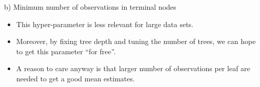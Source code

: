 \documentclass[
  10pt,
  ignorenonframetext,
]{beamer}
\providecommand{\tightlist}{%
  \setlength{\itemsep}{0pt}\setlength{\parskip}{0pt}}
\begin{document}
\begin{frame}
\begin{block}{b) Minimum number of observations in terminal nodes}
\label{b-minimum-number-of-observations-in-terminal-nodes}
\(~\)

\begin{itemize}
\tightlist
\item
  This hyper-parameter is less relevant for large data sets.
\end{itemize}

\vspace{2mm}

\begin{itemize}
\tightlist
\item
  Moreover, by fixing tree depth and tuning the number of trees, we can
  hope to get this parameter ``for free''.
\end{itemize}

\vspace{2mm}

\begin{itemize}
\tightlist
\item
  A reason to care anyway is that larger number of observations per leaf
  are needed to get a good mean estimates.
\end{itemize}

\(~\)

\(~\)
\end{block}
\end{frame}
\end{document}
